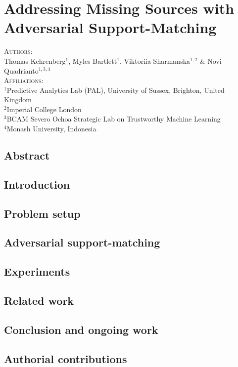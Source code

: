 \chapter{Addressing Missing Sources with Adversarial Support-Matching}\label{ch:supmatch}
\textsc{Authors}:\\
%
Thomas Kehrenberg$^1$, 
Myles Bartlett$^1$,
Viktoriia Sharmanska$^{1, 2}$ \& 
Novi Quadrianto$^{1,3,4}$ \\
%
\textsc{Affiliations}:\\
$^1$Predictive Analytics Lab (PAL), University of Sussex, Brighton, United Kingdom \\
$^2$Imperial College London \\ 
$^3$BCAM Severo Ochoa Strategic Lab on Trustworthy Machine Learning \\
$^4$Monash University, Indonesia \\
%

\section*{Abstract}

\label{sec:sm-abstract}

\section{Introduction}
\label{sec:sm-intro}


\section{Problem setup}
\label{sec:sm-problem-setup}


\section{Adversarial support-matching}
\label{sec:sm-adversarialsm}


\section{Experiments}
\label{sec:sm-exps}


\section{Related work}
\label{sec:sm-related-work}


\section{Conclusion and ongoing work}
\label{sec:sm-conclusion}


% 

\newpage


\clearpage
\section{Authorial contributions}

